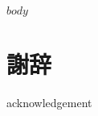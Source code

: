 \documentclass[10pt,a4paper]{jarticle}
\begin{document}
      \maketitle
      \thispagestyle{empty}
      \newpage
      \begin{abstract}
        
      \end{abstract}
      \newpage

      \pagestyle{fancy}
      \rhead{-\thepage-}
      \lhead{}
      \chead{}
      \cfoot{}
      \tableofcontents
      \clearpage
\newpage
{}
\pagestyle{fancy}
\rhead{-\thepage-}
\chead{}
\cfoot{}

$body$

\section*{謝辞}
 {acknowledgement}



\end{document}
